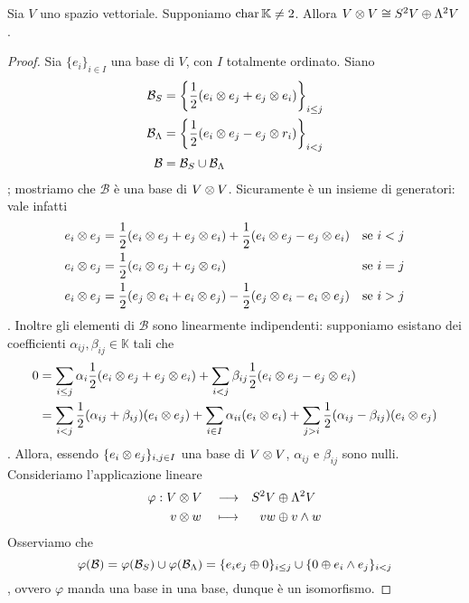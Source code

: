 \begin{proposition}
Sia $V$ uno spazio vettoriale. Supponiamo $\operatorname{char}\mathbb{K}\neq 2$. Allora $V\otimes V\cong S^2 V\oplus\Lambda^2 V$.
\end{proposition}
\begin{proof}
Sia $\{e_i\}_{i\in I}$ una base di $V$, con $I$ totalmente ordinato. Siano
\begin{align*}
\mathcal{B}_S&=\left\{\frac{1}{2}(e_i\otimes e_j+e_j\otimes e_i)\right\}_{i\le j}\\
\mathcal{B}_\Lambda&=\left\{\frac{1}{2}(e_i\otimes e_j-e_j\otimes r_i)\right\}_{i<j}\\
\mathcal{B}&=\mathcal{B}_S\cup\mathcal{B}_\Lambda
\end{align*}
; mostriamo che $\mathcal{B}$ è una base di $V\otimes V$. Sicuramente è un insieme di generatori: vale infatti
\begin{align*}
e_i\otimes e_j&=\frac{1}{2}(e_i\otimes e_j+e_j\otimes e_i)+\frac{1}{2}(e_i\otimes e_j-e_j\otimes e_i)&\text{se $i<j$}\\
e_i\otimes e_j&=\frac{1}{2}(e_i\otimes e_j+e_j\otimes e_i)&\text{se $i=j$}\\
e_i\otimes e_j&=\frac{1}{2}(e_j\otimes e_i+e_i\otimes e_j)-\frac{1}{2}(e_j\otimes e_i-e_i\otimes e_j)&\text{se $i>j$}
\end{align*}
. Inoltre gli elementi di $\mathcal{B}$ sono linearmente indipendenti: supponiamo esistano dei coefficienti $\alpha_{ij},\beta_{ij}\in\mathbb{K}$ tali che
\begin{align*}
0&=\sum_{i\le j}\alpha_i\frac{1}{2}(e_i\otimes e_j+e_j\otimes e_i)+\sum_{i<j}\beta_{ij}\frac{1}{2}(e_i\otimes e_j-e_j\otimes e_i)\\
&=\sum_{i<j}\frac{1}{2}(\alpha_{ij}+\beta_{ij})(e_i\otimes e_j)+\sum_{i\in I}\alpha_{ii}(e_i\otimes e_i)+\sum_{j>i}\frac{1}{2}(\alpha_{ij}-\beta_{ij})(e_i\otimes e_j)
\end{align*}
. Allora, essendo $\{e_i\otimes e_j\}_{i,j\in I}$ una base di $V\otimes V$, $\alpha_{ij}$ e $\beta_{ij}$ sono nulli.\\
Consideriamo l'applicazione lineare
\begin{alignat*}{3}
\varphi:V&\otimes V&&\longrightarrow&S^2V&\oplus\Lambda^2V\\
v&\otimes w&&\longmapsto& vw&\oplus v\wedge w
\end{alignat*}
Osserviamo che
$$
\varphi(\mathcal{B})=\varphi(\mathcal{B}_S)\cup\varphi(\mathcal{B}_\Lambda)=\{e_ie_j\oplus0\}_{i\le j}\cup\{0\oplus e_i\wedge e_j\}_{i<j}
$$
, ovvero $\varphi$ manda una base in una base, dunque è un isomorfismo.
\end{proof}
